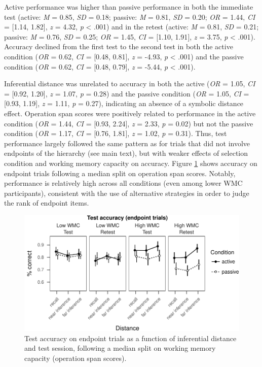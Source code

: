 \documentclass[floatsintext,man]{apa6}
\theoremstyle{definition}
\theoremstyle{definition}
\theoremstyle{definition}
\theoremstyle{remark}
\begin{document}
Active performance was higher than passive performance in both the
immediate test (active: \emph{M} = 0.85, \emph{SD} = 0.18; passive:
\emph{M} = 0.81, \emph{SD} = 0.20; \emph{OR} = 1.44, \emph{CI} =
{[}1.14, 1.82{]}, \emph{z} = 4.32, \emph{p} \textless{} .001) and in the
retest (active: \emph{M} = 0.81, \emph{SD} = 0.21; passive: \emph{M} =
0.76, \emph{SD} = 0.25; \emph{OR} = 1.45, \emph{CI} = {[}1.10, 1.91{]},
\emph{z} = 3.75, \emph{p} \textless{} .001). Accuracy declined from the
first test to the second test in both the active condition (\emph{OR} =
0.62, \emph{CI} = {[}0.48, 0.81{]}, \emph{z} = -4.93, \emph{p}
\textless{} .001) and the passive condition (\emph{OR} = 0.62, \emph{CI}
= {[}0.48, 0.79{]}, \emph{z} = -5.44, \emph{p} \textless{} .001).

Inferential distance was unrelated to accuracy in both the active
(\emph{OR} = 1.05, \emph{CI} = {[}0.92, 1.20{]}, \emph{z} = 1.07,
\emph{p} = 0.28) and the passive condition (\emph{OR} = 1.05, \emph{CI}
= {[}0.93, 1.19{]}, \emph{z} = 1.11, \emph{p} = 0.27), indicating an
absence of a symbolic distance effect. Operation span scores were
positively related to performance in the active condition (\emph{OR} =
1.44, \emph{CI} = {[}0.93, 2.24{]}, \emph{z} = 2.33, \emph{p} = 0.02)
but not the passive condition (\emph{OR} = 1.17, \emph{CI} = {[}0.76,
1.81{]}, \emph{z} = 1.02, \emph{p} = 0.31). Thus, test performance
largely followed the same pattern as for trials that did not involve
endpoints of the hierarchy (see main text), but with weaker effects of
selection condition and working memory capacity on accuracy. Figure
\ref{fig_acc_endpoint} shows accuracy on endpoint trials following a
median split on operation span scores. Notably, performance is
relatively high across all conditions (even among lower WMC
participants), consistent with the use of alternative strategies in
order to judge the rank of endpoint items.

\begin{figure}
\centering
\includegraphics{active_transitive_inference_files/figure-latex/unnamed-chunk-6-1.pdf}
\caption{\label{fig:unnamed-chunk-6}Test accuracy on endpoint trials as a
function of inferential distance and test session, following a median
split on working memory capacity (operation span scores).
\label{fig_acc_endpoint}}
\end{figure}
\end{document}
